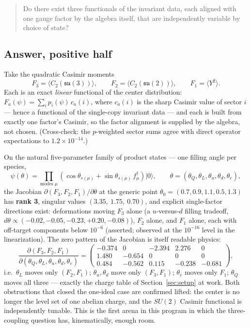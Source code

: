 \documentclass[11pt]{article}
\newcommand{\su}[1]{\mathfrak{su}(#1)}
\begin{document}
\begin{quote}
Do there exist three functionals of the invariant data, each aligned with one gauge factor by the algebra itself, that are independently variable by choice of state?
\end{quote}

\subsection{Answer, positive half}

Take the quadratic Casimir moments
\begin{equation*}
F_3 = \langle C_2(\su3)\rangle, \qquad F_2 = \langle C_2(\su2)\rangle, \qquad F_1 = \langle Y^2\rangle .
\end{equation*}
Each is an exact \emph{linear} functional of the center distribution: $F_a(\psi) = \sum_i p_i(\psi)\, c_a(i)$, where $c_a(i)$ is the sharp Casimir value of sector $i$ --- hence a functional of the single-copy invariant data --- and each is built from exactly one factor's Casimir, so the factor alignment is supplied by the algebra, not chosen. (Cross-check: the $p$-weighted sector sums agree with direct operator expectations to $1.2\times10^{-14}$.)

On the natural five-parameter family of product states --- one filling angle per species,
\begin{equation*}
\psi(\theta) = \prod_{\text{modes } \mu} \left(\cos\theta_{s(\mu)} + \sin\theta_{s(\mu)}\, f_\mu^\dagger\right)|0\rangle, \qquad \theta = (\theta_Q,\theta_L,\theta_u,\theta_d,\theta_e),
\end{equation*}
the Jacobian $\partial(F_3,F_2,F_1)/\partial\theta$ at the generic point $\theta_0 = (0.7, 0.9, 1.1, 0.5, 1.3)$ has \textbf{rank 3}, singular values $(3.35,\ 1.75,\ 0.70)$, and explicit single-factor directions exist: deformations moving $F_3$ alone (a $u$-versus-$d$ filling tradeoff, $d\theta \propto (-0.02, -0.05, -0.23, +0.20, -0.08)$), $F_2$ alone, and $F_1$ alone, each with off-target components below $10^{-6}$ (asserted; observed at the $10^{-16}$ level in the linearization). The zero pattern of the Jacobian is itself readable physics:
\begin{equation*}
\frac{\partial(F_3,F_2,F_1)}{\partial(\theta_Q,\theta_L,\theta_u,\theta_d,\theta_e)}
=
\begin{pmatrix}
-0.374 & 0 & -2.394 & 2.276 & 0\\
1.480 & -0.654 & 0 & 0 & 0\\
0.484 & -0.562 & 0.115 & -0.238 & -0.681
\end{pmatrix},
\end{equation*}
i.e.\ $\theta_L$ moves only $(F_2,F_1)$; $\theta_u,\theta_d$ move only $(F_3,F_1)$; $\theta_e$ moves only $F_1$; $\theta_Q$ moves all three --- exactly the charge table of Section~\ref{sec:setup} at work. Both obstructions that closed the one-ideal case are confirmed lifted: the center is no longer the level set of one abelian charge, and the $SU(2)$ Casimir functional is independently tunable. This is the first arena in this program in which the three-coupling question has, kinematically, enough room.
\end{document}
